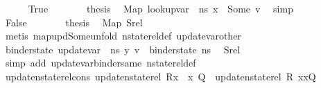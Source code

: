 \begin{isabellebody}
\ \ \ \ \isamarkupfalse%
\ True\isanewline
\ \ \ \ \isamarkupfalse%
\ \isamarkupfalse%
\ {\isacharquery}{\kern0pt}thesis\ \isamarkupfalse%
\ Map\ {\isacartoucheopen}lookup{\isacharunderscore}{\kern0pt}var\ {\isasymLambda}{\isacharprime}{\kern0pt}\ ns{}\ x\ {\isacharequal}{\kern0pt}\ Some\ v{\isacartoucheclose}\ \isamarkupfalse%
\ simp\isanewline
\ \ \isamarkupfalse%
\isanewline
\ \ \ \ \isamarkupfalse%
\ False\isanewline
\ \ \ \ \isamarkupfalse%
\ \isamarkupfalse%
\ {\isacharquery}{\kern0pt}thesis\ \isamarkupfalse%
\ Map\ Srel\isanewline
\ \ \ \ \ \ \isamarkupfalse%
\ {\isacharparenleft}{\kern0pt}metis\ map{\isacharunderscore}{\kern0pt}upd{\isacharunderscore}{\kern0pt}Some{\isacharunderscore}{\kern0pt}unfold\ nstate{\isacharunderscore}{\kern0pt}rel{\isacharunderscore}{\kern0pt}def\ update{\isacharunderscore}{\kern0pt}var{\isacharunderscore}{\kern0pt}other{\isacharparenright}{\kern0pt}\ \isanewline
\ \ \isamarkupfalse%
\isanewline
{}\isamarkupfalse%
\isanewline
\ \ \isamarkupfalse%
\ {\isachardoublequoteopen}binder{\isacharunderscore}{\kern0pt}state\ {\isacharparenleft}{\kern0pt}update{\isacharunderscore}{\kern0pt}var\ {\isasymLambda}\ ns{}\ y\ v{\isacharparenright}{\kern0pt}\ {\isacharequal}{\kern0pt}\ binder{\isacharunderscore}{\kern0pt}state\ ns{}{\isachardoublequoteclose}\ \isamarkupfalse%
\ Srel\ \isanewline
\ \ \ \ \isamarkupfalse%
\ {\isacharparenleft}{\kern0pt}simp\ add{\isacharcolon}{\kern0pt}\ update{\isacharunderscore}{\kern0pt}var{\isacharunderscore}{\kern0pt}binder{\isacharunderscore}{\kern0pt}same\ nstate{\isacharunderscore}{\kern0pt}rel{\isacharunderscore}{\kern0pt}def{\isacharparenright}{\kern0pt}\ \ \ \ \isanewline
{}\isamarkupfalse%
%
\endisatagproof
{\isafoldproof}%
%
\isadelimproof
\isanewline
%
\endisadelimproof
\isanewline
{}\isamarkupfalse%
\ update{\isacharunderscore}{\kern0pt}nstate{\isacharunderscore}{\kern0pt}rel{\isacharunderscore}{\kern0pt}cons{\isacharcolon}{\kern0pt}\ {\isachardoublequoteopen}update{\isacharunderscore}{\kern0pt}nstate{\isacharunderscore}{\kern0pt}rel\ {\isacharparenleft}{\kern0pt}R{\isacharparenleft}{\kern0pt}x\ {\isasymmapsto}\ x{}{\isacharparenright}{\kern0pt}{\isacharparenright}{\kern0pt}\ Q\ {\isacharequal}{\kern0pt}\ update{\isacharunderscore}{\kern0pt}nstate{\isacharunderscore}{\kern0pt}rel\ R\ {\isacharparenleft}{\kern0pt}{\isacharparenleft}{\kern0pt}x{\isacharcomma}{\kern0pt}x{}{\isacharparenright}{\kern0pt}{\isacharhash}{\kern0pt}Q{\isacharparenright}{\kern0pt}{\isachardoublequoteclose}\isanewline

\end{isabellebody}
